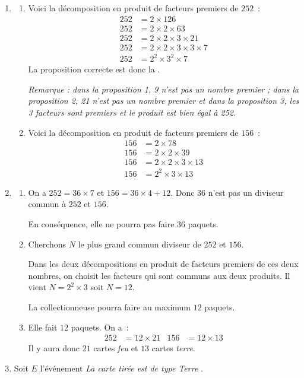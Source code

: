 
\medskip
\begin{enumerate}[itemsep=1em]
\item \begin{enumerate}[itemsep=1em]
  \item Voici la décomposition en produit de facteurs premiers de $252$~:
    \begin{align*}
      252 &= 2\times 126\\
      252 &= 2\times 2\times 63\\
      252 &= 2\times 2\times 3 \times 21\\
      252 &= 2\times 2\times 3 \times 3\times 7\\
      252 &= 2^2\times3^2\times 7
    \end{align*}
    La proposition correcte est donc la .
    
    \medskip
    \textit{Remarque : dans la proposition 1, 9 n'est pas un nombre premier ; dans la proposition 2, 21 n'est pas un nombre premier et dans la proposition 3, les 3 facteurs sont premiers et le produit est bien égal à 252. }
  \item Voici la décomposition en produit de facteurs premiers de $156$~:
    \begin{align*}
      156 &= 2 \times 78\\
      156 &= 2 \times 2 \times 39\\
      156 &= 2 \times 2 \times 3 \times 13\\
      156 &= 2^2 \times 3 \times 13
    \end{align*}
  \end{enumerate}
\item \begin{enumerate}[itemsep=1em]
  \item On a $252=36 \times 7$ et $156=36\times4+12$. Donc $36$ n'est pas un diviseur commun à $252$ et $156$.

    En conséquence, elle ne pourra pas faire $36$ paquets.
  \item Cherchons $N$ le plus grand commun diviseur de $252$ et $156$.

    Dans les deux décompositions en produit de facteurs premiers de ces deux nombres, on choisit les facteurs qui sont communs aux deux produits. Il vient $N=2^2\times3$ soit $N=12$.

    La collectionneuse pourra faire au maximum $12$ paquets.
  \item Elle fait $12$ paquets. On a~:
    \begin{align*}
      252 &= 12\times 21 & 156 &= 12\times13
    \end{align*}
    Il y aura donc $21$ cartes \textit{feu} et $13$ cartes \textit{terre}.
  \end{enumerate}
\item Soit $E$ l'événement \og \textit{La carte tirée est de type Terre} \fg.


\end{enumerate}
